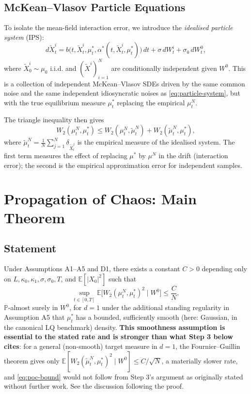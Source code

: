 \subsection{McKean--Vlasov Particle Equations}

To isolate the mean-field interaction error, we introduce the \emph{idealised
particle system} (IPS):
\begin{equation}
    d\tilde{X}_t^i = b\big(t, \tilde{X}_t^i, \mu_t^*, \alpha^*(t, \tilde{X}_t^i,
    \mu_t^*)\big)\, dt + \sigma\, dW_t^i + \sigma_0\, dW_t^0,
    \label{eq:idealised-particle}
\end{equation}
where $\tilde{X}_0^i \sim \mu_0$ i.i.d. and $(\tilde{X}^i)_{i=1}^N$ are
conditionally independent given $W^0$. This is a collection of independent
McKean--Vlasov SDEs driven by the same common noise and the same independent
idiosyncratic noises as \eqref{eq:particle-system}, but with the true equilibrium
measure $\mu_t^*$ replacing the empirical $\mu_t^N$.

The triangle inequality then gives
\[
    W_2(\mu_t^N, \mu_t^*) \le W_2(\mu_t^N, \tilde\mu_t^N) + W_2(\tilde\mu_t^N,
    \mu_t^*),
\]
where $\tilde\mu_t^N = \frac{1}{N}\sum_{j=1}^N \delta_{\tilde{X}_t^j}$ is the
empirical measure of the idealised system. The first term measures the effect of
replacing $\mu^*$ by $\mu^N$ in the drift (interaction error); the second is the
empirical approximation error for independent samples.

\section{Propagation of Chaos: Main Theorem}

\subsection{Statement}

\begin{theorem}
\label{thm:poc}
Under Assumptions A1--A5 and D1, there exists a constant $C > 0$ depending only
on $L, \kappa_0, \kappa_1, \sigma, \sigma_0, T$, and $\mathbb{E}[|X_0|^2]$ such
that
\begin{equation}
    \sup_{t \in [0,T]} \mathbb{E}\big[W_2(\mu_t^N, \mu_t^*)^2 \mid W^0\big]
    \le \frac{C}{N},
    \label{eq:poc-bound}
\end{equation}
$\mathbb{P}$-almost surely in $W^0$, for $d = 1$ under the additional standing
regularity in Assumption A5 that $\mu_t^*$ has a bounded, sufficiently smooth
(here: Gaussian, in the canonical LQ benchmark) density. \textbf{This
smoothness assumption is essential to the stated rate and is stronger than what
Step 3 below cites}: for a general (non-smooth) target measure in $d=1$, the
Fournier--Guillin theorem \citep{fournierguillin2015} gives only
$\mathbb{E}[W_2(\tilde\mu_t^N,\mu_t^*)^2 \mid W^0] \le C/\sqrt{N}$, a materially
slower rate, and \eqref{eq:poc-bound} would not follow from Step 3's argument
as originally stated without further work. See the discussion following the
proof.
\end{theorem}

